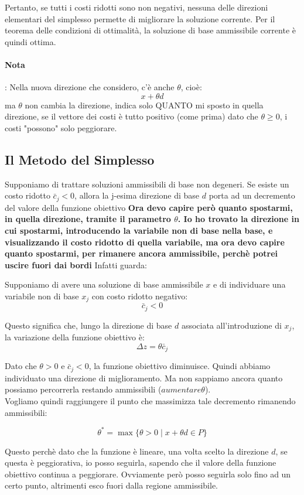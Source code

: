 Pertanto, se tutti i costi ridotti sono non negativi, nessuna delle direzioni elementari del simplesso permette di migliorare la soluzione corrente. Per il teorema delle condizioni di ottimalità, la soluzione di base ammissibile corrente è quindi ottima.


\paragraph{Nota} : Nella nuova direzione che considero, c'è anche $\theta$, cioè:
\[
x + \theta d
\]
ma $\theta$ non cambia la direzione, indica solo QUANTO mi sposto in quella direzione, se il vettore dei costi è tutto positivo (come prima) dato che $\theta \ge 0 $, i costi "possono" solo peggiorare.

\subsection{Il Metodo del Simplesso}

Supponiamo di trattare soluzioni ammissibili di base non degeneri. Se esiste un costo ridotto $\bar{c}_j < 0$, allora la j-esima direzione di base $d$ porta ad un decremento del valore della funzione obiettivo
\textbf{Ora devo capire però quanto spostarmi, in quella direzione, tramite il parametro $\theta$.
Io ho trovato la direzione in cui spostarmi, introducendo la variabile non di base nella base, e visualizzando il costo ridotto di quella variabile, ma ora devo capire quanto spostarmi, per rimanere ancora ammissibile, perchè potrei uscire fuori dai bordi}
Infatti guarda:

Supponiamo di avere una soluzione di base ammissibile \(x\) e di individuare una variabile non di base \(x_j\) con costo ridotto negativo:
\[
\bar c_j<0
\]

Questo significa che, lungo la direzione di base \(d\) associata all'introduzione di \(x_j\), la variazione della funzione obiettivo è:
\[
\Delta z=\theta\bar c_j
\]

Dato che \(\theta>0\) e \(\bar c_j<0\), la funzione obiettivo diminuisce.
Quindi abbiamo individuato una direzione di miglioramento. Ma non sappiamo ancora quanto possiamo percorrerla restando ammissibili ($aumentare \theta$).
\\
Vogliamo quindi raggiungere il punto che massimizza tale decremento rimanendo ammissibili:


$$\theta^* = \max \{ \theta > 0 \mid x + \theta d \in P \}$$

Questo perchè dato che la funzione è lineare, una volta scelto la direzione $d$, se questa è peggiorativa, io posso seguirla, sapendo che il valore della funzione obiettivo continua a peggiorare.
Ovviamente però posso seguirla solo fino ad un certo punto, altrimenti esco fuori dalla regione ammissibile.

